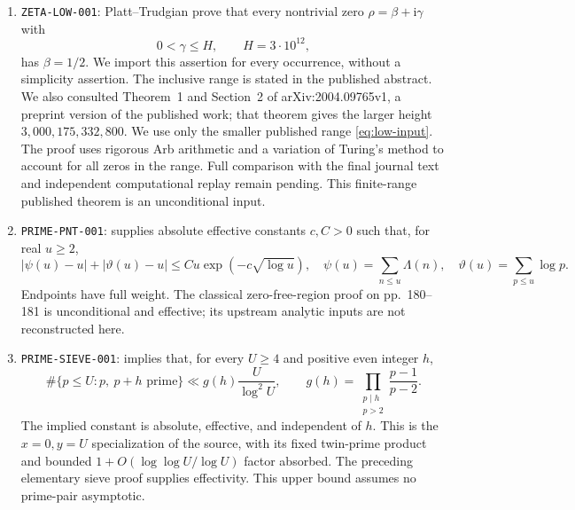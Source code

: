 \documentclass[11pt]{article}
\newcommand{\ii}{\mathrm i}
\begin{document}
\begin{enumerate}
We checked the published version of record, including its stated domain
and constants; we have not independently reconstructed its proof.
Its Section~5 uses, among other inputs, the rigorous finite-height
verification of Platt--Trudgian \cite{PT2021} up to \(3\cdot10^{12}\);
Sections~8--9 describe additional computational ingredients.
The ledger records this external computational dependence with no
locally replayed certificate. No unproved RH or simplicity assumption
is imposed. Lemma~\ref{lem:pair-envelope} uses this input together with
the following low-height theorem.
\item \texttt{ZETA-LOW-001}\label{inp:low}:
Platt--Trudgian \cite{PT2021} prove that every nontrivial zero
\(\rho=\beta+\ii\gamma\) with
\begin{equation}\label{eq:low-input}
 0<\gamma\leq H,\qquad H=3\cdot10^{12},
\end{equation}
has \(\beta=1/2\). We import this assertion for every occurrence,
without a simplicity assertion. The inclusive range is stated in the
published abstract. We also consulted Theorem~1 and Section~2 of
arXiv:2004.09765v1, a preprint version of the published work; that
theorem gives the larger height \(3{,}000{,}175{,}332{,}800\).
We use only the smaller published range \eqref{eq:low-input}.
The proof uses rigorous Arb arithmetic and a variation of Turing's
method to account for all zeros in the range. Full comparison with
the final journal text and independent computational replay remain
pending. This finite-range published theorem is an unconditional input.
\item \texttt{PRIME-PNT-001}\label{inp:prime-pnt}:
\cite[Theorem 6.9, (6.12)--(6.13), p.~179]{MV2007} supplies absolute
effective constants \(c,C>0\) such that, for real \(u\geq2\),
\begin{equation}\label{eq:prime-pnt-input}
 |\psi(u)-u|+|\vartheta(u)-u|
 \leq Cu\exp(-c\sqrt{\log u}),
 \quad
 \psi(u)=\sum_{n\leq u}\Lambda(n),\quad
 \vartheta(u)=\sum_{p\leq u}\log p.
\end{equation}
Endpoints have full weight. The classical zero-free-region proof on
pp.~180--181 is unconditional and effective; its upstream analytic
inputs are not reconstructed here.
\item \texttt{PRIME-SIEVE-001}\label{inp:prime-sieve}:
\cite[Corollary 3.14, p.~97]{MV2007} implies that, for every \(U\geq4\)
and positive even integer \(h\),
\begin{equation}\label{eq:prime-sieve-input}
 \#\{p\leq U:p,\ p+h\text{ prime}\}
 \ll g(h)\frac{U}{\log^2U},
 \qquad
 g(h)=\prod_{\substack{p\mid h\\p>2}}\frac{p-1}{p-2}.
\end{equation}
The implied constant is absolute, effective, and independent of \(h\).
This is the \(x=0,y=U\) specialization of the source, with its fixed
twin-prime product and bounded \(1+O(\log\log U/\log U)\) factor
absorbed. The preceding elementary sieve proof supplies effectivity.
This upper bound assumes no prime-pair asymptotic.
\end{enumerate}
\end{document}
